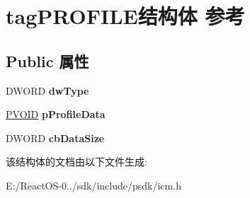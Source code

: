 \hypertarget{structtag_p_r_o_f_i_l_e}{}\section{tag\+P\+R\+O\+F\+I\+L\+E结构体 参考}
\label{structtag_p_r_o_f_i_l_e}
\subsection*{Public 属性}
\begin{DoxyCompactItemize}
\item 
\mbox{\label{structtag_p_r_o_f_i_l_e_a84f9bc34f9af978d687cf2735dd224da}} 
D\+W\+O\+RD {\bfseries dw\+Type}
\item 
\mbox{\label{structtag_p_r_o_f_i_l_e_aa97cfe1358da9337473187bf95e352b2}} 
\hyperlink{interfacevoid}{P\+V\+O\+ID} {\bfseries p\+Profile\+Data}
\item 
\mbox{\label{structtag_p_r_o_f_i_l_e_a7c4d0cc8deb63285d7a9eb82bd9bb4c2}} 
D\+W\+O\+RD {\bfseries cb\+Data\+Size}
\end{DoxyCompactItemize}


该结构体的文档由以下文件生成\+:\begin{DoxyCompactItemize}
\item 
E\+:/\+React\+O\+S-\/0../sdk/include/psdk/icm.\+h\end{DoxyCompactItemize}
